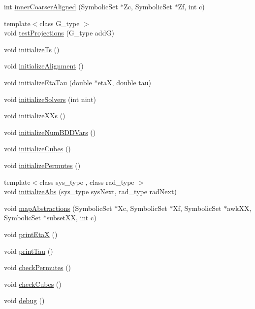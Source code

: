\begin{DoxyCompactItemize}
\item 
int \hyperlink{classscots_1_1Adaptive_a01f8f69d290f9c81f76f6ab44d9ef193}{inner\+Coarser\+Aligned} (Symbolic\+Set $\ast$Zc, Symbolic\+Set $\ast$Zf, int c)
\item 
{\footnotesize template$<$class G\+\_\+type $>$ }\\void \hyperlink{classscots_1_1Adaptive_aa4f1995704cf927fff530e715a6214ec}{test\+Projections} (G\+\_\+type addG)
\item 
void \hyperlink{classscots_1_1Adaptive_aec99424e29ff42e2e7e46f747cb6ed34}{initialize\+Ts} ()
\item 
void \hyperlink{classscots_1_1Adaptive_a8f23922cbd2768a8339c73928ddc9c5a}{initialize\+Alignment} ()
\item 
void \hyperlink{classscots_1_1Adaptive_a3dca1d73761d2678f981512dee5c325d}{initialize\+Eta\+Tau} (double $\ast$etaX, double tau)
\item 
void \hyperlink{classscots_1_1Adaptive_a25cc058f39f38402ff914ae6b927393e}{initialize\+Solvers} (int nint)
\item 
void \hyperlink{classscots_1_1Adaptive_af08ee7fae4cf6c5ae1fcabb8699e0721}{initialize\+X\+Xs} ()
\item 
void \hyperlink{classscots_1_1Adaptive_ab75f4bbed30ecc70747185f36fcab200}{initialize\+Num\+B\+D\+D\+Vars} ()
\item 
void \hyperlink{classscots_1_1Adaptive_a2b4a5e42c1a4fca883c132b02295bf11}{initialize\+Cubes} ()
\item 
void \hyperlink{classscots_1_1Adaptive_a7351461977b9be0f07ec2974531af677}{initialize\+Permutes} ()
\item 
{\footnotesize template$<$class sys\+\_\+type , class rad\+\_\+type $>$ }\\void \hyperlink{classscots_1_1Adaptive_ae8e0a243c51d3596f994f2b0668892e4}{initialize\+Abs} (sys\+\_\+type sys\+Next, rad\+\_\+type rad\+Next)
\item 
void \hyperlink{classscots_1_1Adaptive_a4e6a4284b5f3ef75816aaaefaf8fe51a}{map\+Abstractions} (Symbolic\+Set $\ast$Xc, Symbolic\+Set $\ast$Xf, Symbolic\+Set $\ast$awk\+XX, Symbolic\+Set $\ast$subset\+XX, int c)
\item 
void \hyperlink{classscots_1_1Adaptive_af192d9fee4a464e21d88b2d9735c5053}{print\+EtaX} ()
\item 
void \hyperlink{classscots_1_1Adaptive_a7e3c0b5babfb943dcda7f7f5c89cbb3e}{print\+Tau} ()
\item 
void \hyperlink{classscots_1_1Adaptive_aba179a9fad6056239005127af2e95f45}{check\+Permutes} ()
\item 
void \hyperlink{classscots_1_1Adaptive_a5e8e6dc690e2c800338fd2c866af8889}{check\+Cubes} ()
\item 
void \hyperlink{classscots_1_1Adaptive_a8ea5724cde577baf708496d6bef7e548}{debug} ()
\end{DoxyCompactItemize}
